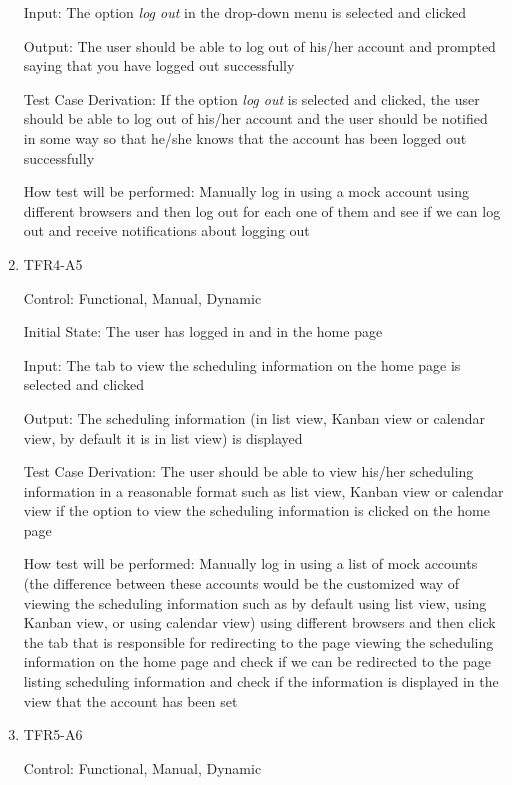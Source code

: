 \documentclass[12pt, titlepage]{article}
\begin{document}
\begin{enumerate}
  Input: The option \textit{log out} in the drop-down menu is selected and clicked
            
  Output: The user should be able to log out of his/her account and prompted saying that you have logged out successfully
  
  Test Case Derivation: If the option \textit{log out} is selected and clicked, the user should be able to log out of his/her account and the user should be notified in some way so that he/she knows that the account has been logged out successfully
  
  How test will be performed: Manually log in using a mock account using different browsers and then log out for each one of them and see if we can log out and receive notifications about logging out
  
  \item{TFR4-A5\\} \label{TFR4-A5}
  
  Control: Functional, Manual, Dynamic
            
  Initial State: The user has logged in and in the home page
            
  Input:  The tab to view the scheduling information on the home page is selected and clicked
            
  Output: The scheduling information (in list view, Kanban view or calendar view, by default it is in list view) is displayed
  
  Test Case Derivation: The user should be able to view his/her scheduling information in a reasonable format such as list view, Kanban view or calendar view if the option to view the scheduling information is clicked on the home page
            
  How test will be performed: Manually log in using a list of mock accounts (the difference between these accounts would be the customized way of viewing the scheduling information such as by default using list view, using Kanban view, or using calendar view) using different browsers and then click the tab that is responsible for redirecting to the page viewing the scheduling information on the home page and check if we can be redirected to the page listing scheduling information and check if the information is displayed in the view that the account has been set
  
  \item{TFR5-A6\\} \label{TFR5-A6}
  
  Control: Functional, Manual, Dynamic
            

\end{enumerate}
\end{document}

